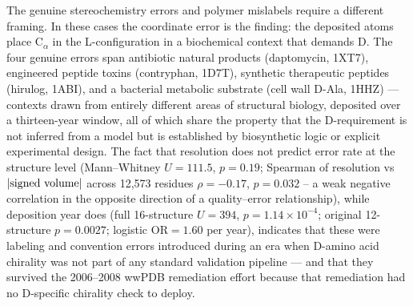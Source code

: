 \documentclass[11pt]{article}
\begin{document}
The genuine stereochemistry errors and polymer mislabels require a different framing. In these cases the coordinate error is the finding: the deposited atoms place C$_\alpha$ in the L-configuration in a biochemical context that demands D. The four genuine errors span antibiotic natural products (daptomycin, 1XT7), engineered peptide toxins (contryphan, 1D7T), synthetic therapeutic peptides (hirulog, 1ABI), and a bacterial metabolic substrate (cell wall D-Ala, 1HHZ) --- contexts drawn from entirely different areas of structural biology, deposited over a thirteen-year window, all of which share the property that the D-requirement is not inferred from a model but is established by biosynthetic logic or explicit experimental design. The fact that resolution does not predict error rate at the structure level (Mann--Whitney $U=111.5$, $p=0.19$; Spearman of resolution vs $|\textnormal{signed volume}|$ across 12{,}573 residues $\rho=-0.17$, $p=0.032$ -- a weak negative correlation in the opposite direction of a quality--error relationship), while deposition year does (full 16-structure $U=394$, $p=1.14\times10^{-4}$; original 12-structure $p=0.0027$; logistic $\mathrm{OR}=1.60$ per year), indicates that these were labeling and convention errors introduced during an era when D-amino acid chirality was not part of any standard validation pipeline --- and that they survived the 2006--2008 wwPDB remediation effort \citep{henrick2008} because that remediation had no D-specific chirality check to deploy.
\end{document}
